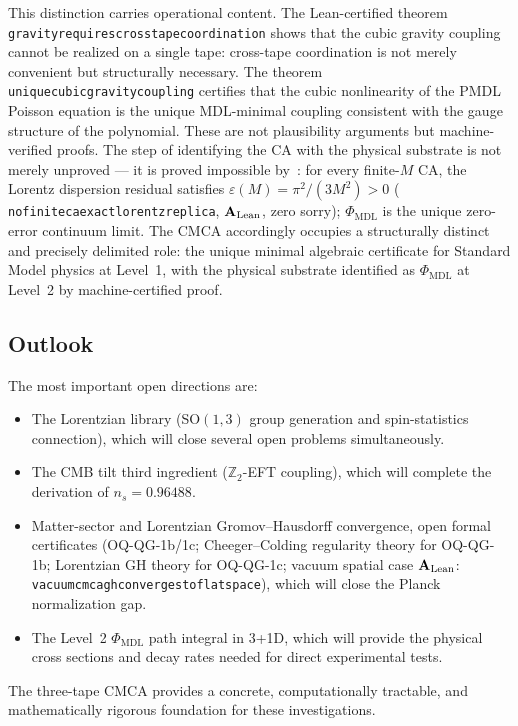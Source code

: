 \documentclass[11pt]{article}
\theoremstyle{remark}
\newcommand{\PHIMDL}{\Phi_{\mathrm{MDL}}}
\newcommand{\ZZ}{\mathbb{Z}}
\newcommand{\lean}[1]{%
  \penalty-100
  \begingroup\def\_{\textunderscore\allowbreak}\texttt{#1}\endgroup}
\newcommand{\CatAL}{\ensuremath{\textbf{A}_{\rm Lean}}}
\newcommand{\CMCA}{\text{CMCA}}
\begin{document}
This distinction carries operational content.
The Lean-certified theorem \lean{gravity\_requires\_cross\_tape\_coordination}
shows that the cubic gravity coupling cannot be realized on a single tape:
cross-tape coordination is not merely convenient but structurally necessary.
The theorem \lean{unique\_cubic\_gravity\_coupling} certifies that the cubic
nonlinearity of the PMDL Poisson equation is the unique MDL-minimal coupling
consistent with the gauge structure of the polynomial.
These are not plausibility arguments but machine-verified proofs.
The step of identifying the CA with the physical substrate is not merely
unproved --- it is proved impossible by~\cite{SpivackCompleteness}: for every
finite-$M$ CA, the Lorentz dispersion residual satisfies
$\varepsilon(M)=\pi^2/(3M^2)>0$ (\lean{no\_finite\_ca\_exact\_lorentz\_replica},
$\CatAL$, zero sorry); $\PHIMDL$ is the unique zero-error continuum limit.
The CMCA accordingly occupies a structurally distinct and precisely delimited
role: the unique minimal algebraic certificate for Standard Model physics at
Level~1, with the physical substrate identified as $\PHIMDL$ at Level~2 by
machine-certified proof.

\subsection{Outlook}

The most important open directions are:
\begin{itemize}
  \item The Lorentzian library (SO$(1,3)$ group generation and
        spin-statistics connection), which will close several open
        problems simultaneously.
  \item The CMB tilt third ingredient ($\ZZ_2$-EFT coupling), which will
        complete the derivation of $n_s = 0.96488$.
  \item Matter-sector and Lorentzian Gromov--Hausdorff convergence, open formal
        certificates (OQ-QG-1b/1c; Cheeger--Colding regularity theory for OQ-QG-1b;
        Lorentzian GH theory for OQ-QG-1c; vacuum spatial case \CatAL:
        \lean{vacuum\_cmca\_gh\_converges\_to\_flat\_space}), which will close the
        Planck normalization gap.
  \item The Level~2 $\PHIMDL$ path integral in 3+1D, which will provide
        the physical cross sections and decay rates needed for direct
        experimental tests.
\end{itemize}

The three-tape $\CMCA$ provides a concrete, computationally tractable,
and mathematically rigorous foundation for these investigations.
\end{document}

